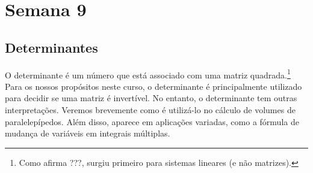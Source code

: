 \documentclass[../livro.tex]{subfiles}  %
\begin{document}
\chapter{Semana 9}

\section{Determinantes}

O determinante é um número que está associado com uma matriz quadrada.\footnote{Como afirma ???, surgiu primeiro para sistemas lineares (e não matrizes).} Para os nossos propósitos neste curso, o determinante é principalmente utilizado para decidir se uma matriz é invertível. No entanto, o determinante tem outras interpretações. Veremos brevemente como é utilizá-lo no cálculo de volumes de paralelepípedos. Além disso, aparece em aplicações variadas, como a fórmula de mudança de variáveis em integrais múltiplas.
\end{document}
